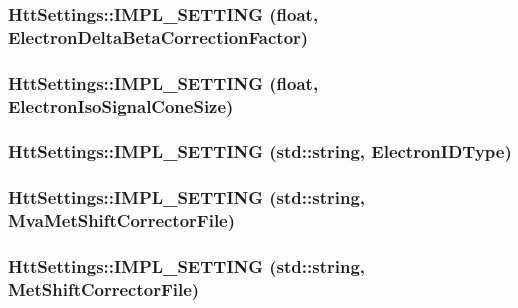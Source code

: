 \label{classHttSettings_a15a54c3d01ca1b2297236e75b041f840}
\hypertarget{classHttSettings_ac294180c9793f6cb652ced772ca22c59}{
\subsubsection[{IMPL\_\-SETTING}]{\setlength{\rightskip}{0pt plus 5cm}HttSettings::IMPL\_\-SETTING (float, \/  ElectronDeltaBetaCorrectionFactor)}}
\label{classHttSettings_ac294180c9793f6cb652ced772ca22c59}
\hypertarget{classHttSettings_a18c013ee9d78c831b113e5adb507d3b7}{
\subsubsection[{IMPL\_\-SETTING}]{\setlength{\rightskip}{0pt plus 5cm}HttSettings::IMPL\_\-SETTING (float, \/  ElectronIsoSignalConeSize)}}
\label{classHttSettings_a18c013ee9d78c831b113e5adb507d3b7}
\hypertarget{classHttSettings_a26c8ae57efd90dbab0c4ddd2b3e9a490}{
\subsubsection[{IMPL\_\-SETTING}]{\setlength{\rightskip}{0pt plus 5cm}HttSettings::IMPL\_\-SETTING (std::string, \/  ElectronIDType)}}
\label{classHttSettings_a26c8ae57efd90dbab0c4ddd2b3e9a490}
\hypertarget{classHttSettings_a1e48c177204aca674b7a2cc958b0990e}{
\subsubsection[{IMPL\_\-SETTING}]{\setlength{\rightskip}{0pt plus 5cm}HttSettings::IMPL\_\-SETTING (std::string, \/  MvaMetShiftCorrectorFile)}}
\label{classHttSettings_a1e48c177204aca674b7a2cc958b0990e}
\hypertarget{classHttSettings_a8cd0a1343cd2ae2b2e68fd148e41e59b}{
\subsubsection[{IMPL\_\-SETTING}]{\setlength{\rightskip}{0pt plus 5cm}HttSettings::IMPL\_\-SETTING (std::string, \/  MetShiftCorrectorFile)}}
